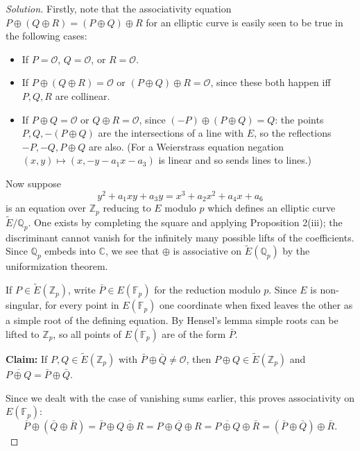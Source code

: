 \documentclass[a4paper]{article}
\theoremstyle{definition}
\renewcommand{\O}{\mathcal{O}}
\newcommand{\F}{\mathbb{F}}
\newcommand{\Z}{\mathbb{Z}}
\newcommand{\Q}{\mathbb{Q}}
\newcommand{\C}{\mathbb{C}}
\begin{document}
\begin{enumerate}
        \begin{proof}[Solution]
            Firstly, note that the associativity equation
            $P\oplus(Q\oplus R)=(P\oplus Q)\oplus R$ for an elliptic curve is
            easily seen to be true in the following cases:
            \begin{itemize}
                \item If $P=\O$, $Q=\O$, or $R=\O$.
                \item If $P\oplus(Q\oplus R)=\O$ or $(P\oplus Q)\oplus R=\O$,
                    since these both happen iff $P,Q,R$ are collinear.
                \item If $P\oplus Q=\O$ or $Q\oplus R=\O$, since
                    $(-P)\oplus(P\oplus Q)=Q$: the points $P,Q,-(P\oplus Q)$ are
                    the intersections of a line with $E$, so the reflections
                    $-P,-Q,P\oplus Q$ are also. (For a Weierstrass equation
                    negation $(x,y)\mapsto(x,-y-a_1x-a_3)$ is linear and so
                    sends lines to lines.)
            \end{itemize}
            Now suppose
            \begin{equation*}
                y^2 + a_1xy + a_3y = x^3 + a_2x^2 + a_4x + a_6
            \end{equation*}
            is an equation over $\Z_p$ reducing to $E$ modulo $p$ which defines
            an elliptic curve $\tilde E/\Q_p$. One exists by completing the
            square and applying Proposition 2(iii); the discriminant cannot
            vanish for the infinitely many possible lifts of the coefficients.
            Since $\Q_p$ embeds into $\C$, we see that $\oplus$ is associative
            on $\tilde E(\Q_p)$ by the uniformization theorem.

            If $P\in\tilde E(\Z_p)$, write $\bar P\in E(\F_p)$ for the reduction
            modulo $p$. Since $E$ is non-singular, for every point in $E(\F_p)$
            one coordinate when fixed leaves the other as a simple root of the
            defining equation. By Hensel's lemma simple roots can be lifted to
            $\Z_p$, so all points of $E(\F_p)$ are of the form $\bar P$.

            \textbf{Claim:} If $P,Q\in\tilde E(\Z_p)$ with
            $\bar P\oplus\bar Q\ne\O$, then $P\oplus Q\in\tilde E(\Z_p)$ and
            $\overline{P\oplus Q}=\bar P\oplus\bar Q$.

            Since we dealt with the case of vanishing sums earlier, this proves
            associativity on $E(\F_p)$:
            \begin{equation*}
                \bar P\oplus(\bar Q\oplus\bar R)
                    = \bar P\oplus\overline{Q\oplus R}
                    = \overline{P\oplus Q\oplus R}
                    = \overline{P\oplus Q}\oplus\bar R
                    = (\bar P\oplus\bar Q)\oplus\bar R.
            \end{equation*}


\end{proof}
\end{enumerate}
\end{document}
